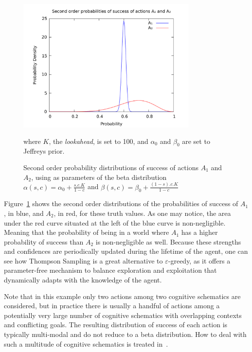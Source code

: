 \documentclass[runningheads]{llncs}
\begin{document}
\begin{figure}
  \centerline{\includegraphics[width=0.8\textwidth]{pictures/actiondist.pdf}}
  \caption{Second order probability distributions of success of
    actions $A_1$ and $A_2$, using as parameters of the beta
    distribution $\alpha(s, c)=\alpha_0 + \frac{s.c.K}{1-c}$ and
    $\beta(s, c)=\beta_0 + \frac{(1-s).c.K}{1-c}$} where $K$, the
  \emph{lookahead}, is set to 100, and $\alpha_0$ and $\beta_0$ are
  set to Jeffreys prior.
  \label{fig:actiondist}
\end{figure}
Figure~\ref{fig:actiondist} shows the second order distributions of
the probabilities of success of $A_1$, in blue, and $A_2$, in red, for
these truth values.  As one may notice, the area under the red curve
situated at the left of the blue curve is non-negligible.  Meaning
that the probability of being in a world where $A_1$ has a higher
probability of success than $A_2$ is non-negligible as well.  Because
these strengths and confidences are periodically updated during the
lifetime of the agent, one can see how Thompson Sampling is a great
alternative to $\varepsilon$-greedy, as it offers a parameter-free
mechanism to balance exploration and exploitation that dynamically
adapts with the knowledge of the agent.

Note that in this example only two actions among two cognitive
schematics are considered, but in practice there is usually a handful
of actions among a potentially very large number of cognitive
schematics with overlapping contexts and conflicting goals.  The
resulting distribution of success of each action is typically
multi-modal and do not reduce to a beta distribution.  How to deal
with such a multitude of cognitive schematics is treated
in~\cite{Geisweiller2018}.
\end{document}
